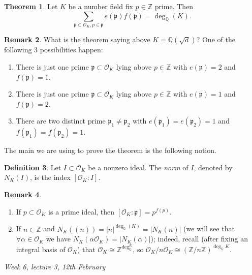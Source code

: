 \documentclass{article}
\newcommand{\Z}{\mathbb{Z}}
\newcommand{\Q}{\mathbb{Q}}
\newcommand{\ri}{\mathcal{O}}
\newcommand{\ip}{\mathfrak{p}}
\theoremstyle{definition}
\newtheorem{defn}{Definition}[subsection]
\newtheorem{thm}[defn]{Theorem}
\newtheorem{remark}[defn]{Remark}
\begin{document}
\begin{thm}
\label{thm:ramineanddeg}
Let $K$ be a number field fix $p\in\Z$ prime. Then
\[
\sum_{\ip\subset\ri_K,p\in\ip} e(\ip)f(\ip)=\deg_\Q(K).
\]
\end{thm}
\begin{remark}
\label{remark:ramineinquadext}
What is the theorem saying above $K=\Q\left(\sqrt d\right)$? One of the following 3 possibilities happen:
\begin{enumerate}
\item There is just one prime $\ip\subset\ri_K$ lying above $p\in\Z$ with $e(\ip)=2$ and $f(\ip)=1$.
\item There is just one prime $\ip\subset\ri_K$ lying above $p\in\Z$ with $e(\ip)=1$ and $f(\ip)=2$. 
\item There are two distinct prime $\ip_1\neq\ip_2$ with $e(\ip_1)=e(\ip_2)=1$ and $f(\ip_1)=f(\ip_2)=1$.
\end{enumerate}
\end{remark}

The main we are using to prove the theorem is the following notion.

\begin{defn}
Let $I\subset\ri_K$ be a nonzero ideal. The \textit{norm} of $I$, denoted by $N_K(I)$, is the index $[\ri_K:I]$.
\end{defn}

\begin{remark}
\label{remark:normofideal}
\begin{enumerate}
\item If $p\subset\ri_K$ is a prime ideal, then $[\ri_K:\ip]=p^{f(p)}$.
\item If $n\in\Z$ and $N_K((n))=|n|^{\deg_\Q(K)}=|N_K(n)|$ (we will see that $\forall\alpha\in\ri_K$ we have $N_K(\alpha\ri_K)=|N_K(\alpha)|$); indeed, recall (after fixing an integral basis of $\ri_K$) that $\ri_K\cong\Z^{\deg_\Q^K}$, so $\ri_K/n\ri_K\cong(\Z/n\Z)^{\deg_\Q K}$.
\end{enumerate}
\end{remark}

\begin{flushright}
\textit{Week 6, lecture 3, 12th February}
\end{flushright}
\end{document}
